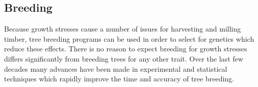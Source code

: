 \subsection{Breeding}
Because growth stresses cause a number of issues for harvesting and milling
timber, tree breeding programs can be used in order to select for
genetics which reduce these effects. There is no reason to expect  breeding for
growth stresses differs significantly from breeding trees for
any other trait. Over the last few decades many advances have been made in
experimental and statistical techniques which rapidly improve the time and
accuracy of tree breeding.